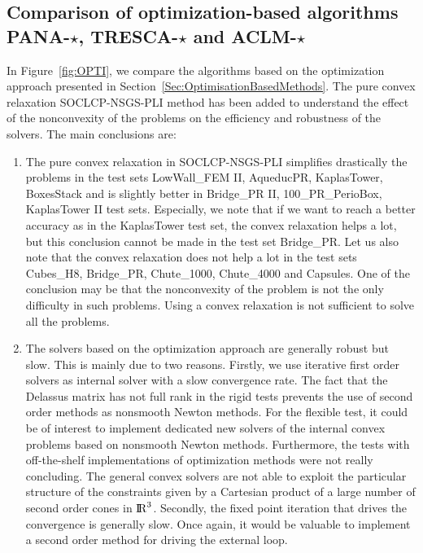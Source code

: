\subsection{Comparison of optimization-based algorithms {\sf PANA-$\star$, TRESCA-$\star$ and ACLM-$\star$}}

In Figure~\ref{fig:OPTI}, we compare the algorithms based on the optimization approach presented in Section~\ref{Sec:OptimisationBasedMethods}. The pure convex relaxation {\sf SOCLCP-NSGS-PLI}  method has been added to understand the effect of the nonconvexity of the problems on the efficiency and robustness of the solvers. The main conclusions are:
\begin{enumerate}
\item The pure convex relaxation in {\sf SOCLCP-NSGS-PLI}  simplifies drastically the problems in the test sets  LowWall\_FEM II, AqueducPR, KaplasTower, BoxesStack  and is slightly better in Bridge\_PR II, 100\_PR\_PerioBox, KaplasTower II test sets. Especially, we note that if we want to reach a better accuracy as in the KaplasTower test set, the convex relaxation helps a lot, but this conclusion cannot be made in the test set Bridge\_PR. Let us also note that  the convex relaxation does not help a lot in the test sets Cubes\_H8, Bridge\_PR, Chute\_1000, Chute\_4000 and Capsules. One of the conclusion may be that the nonconvexity of the problem is not the only difficulty in such problems. Using a convex relaxation is not sufficient to solve all the problems.
\item The solvers based on the optimization approach are generally robust but slow. This is mainly due to two reasons. Firstly,  we use iterative first order solvers as internal solver with a slow convergence rate. The fact that  the Delassus matrix has not full rank in the rigid tests prevents the use of second order methods as nonsmooth Newton methods.  For the flexible test, it could be of interest to implement dedicated new solvers of the internal convex problems based on nonsmooth Newton methods. Furthermore, the tests with off-the-shelf implementations of optimization methods  were not really concluding. The general convex solvers are not  able to exploit the particular structure of the constraints given by a Cartesian product of a large number of second order cones in $\mathrm{I\!R}^3$. Secondly, the fixed point iteration that drives the convergence is generally slow. Once again, it would be valuable to implement a second order method for driving the external loop.

\end{enumerate}
